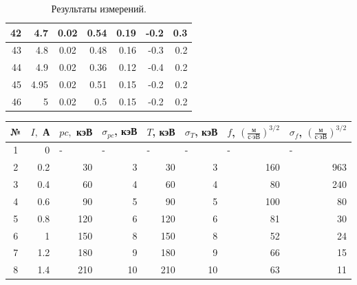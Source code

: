 \documentclass{article}
\begin{document}
\begin{table}[h!]
\begin{tabular}{|c|r|c|r|r|r|r|}
\multicolumn{1}{|r|}{42} & 4.7  & 0.02 & 0.54 & 0.19 & -0.2 & 0.3 \\ \hline
\multicolumn{1}{|r|}{43} & 4.8  & 0.02 & 0.48 & 0.16 & -0.3 & 0.2 \\ \hline
\multicolumn{1}{|r|}{44} & 4.9  & 0.02 & 0.36 & 0.12 & -0.4 & 0.2 \\ \hline
\multicolumn{1}{|r|}{45} & 4.95 & 0.02 & 0.51 & 0.15 & -0.2 & 0.2 \\ \hline
\multicolumn{1}{|r|}{46} & 5    & 0.02 & 0.5  & 0.15 & -0.2 & 0.2 \\ \hline
\end{tabular}
\caption{Результаты измерений.}
\label{BetaParticles_ExpTable}
\end{table}


  \begin{table}[h!]
\centering
\begin{tabular}{|c|r|r|r|r|r|r|r|}
\hline
№ &
  \multicolumn{1}{c|}{$ I, $ А} &
  \multicolumn{1}{c|}{$ pc,$ кэВ} &
  \multicolumn{1}{c|}{$ \sigma_{pc}$, кэВ} &
  \multicolumn{1}{c|}{$ T $, кэВ} &
  \multicolumn{1}{c|}{$ \sigma_T $, кэВ} &
  \multicolumn{1}{c|}{$ f$, $(\frac{\text{м}}{\text{с} \cdot \text{эВ}})^{3/2 }$} &
  \multicolumn{1}{c|}{$ \sigma_f$, $(\frac{\text{м}}{\text{с} \cdot \text{эВ}})^{3/2 }$}\\ \hline
1 &
  0 &
  \multicolumn{1}{l|}{-} &
  \multicolumn{1}{l|}{-} &
  \multicolumn{1}{l|}{-} &
  \multicolumn{1}{l|}{-} &
  \multicolumn{1}{l|}{-} &
  \multicolumn{1}{l|}{-} \\ \hline
2                        & 0.2  & 30  & 3  & 30  & 3  & 160                    & 963                    \\ \hline
3                        & 0.4  & 60  & 4  & 60  & 4  & 80                     & 240                    \\ \hline
4                        & 0.6  & 90  & 5  & 90  & 5  & 100                    & 80                     \\ \hline
5                        & 0.8  & 120 & 6  & 120 & 6  & 81                     & 30                     \\ \hline
6                        & 1    & 150 & 8  & 150 & 8  & 52                     & 24                     \\ \hline
7                        & 1.2  & 180 & 9  & 180 & 9  & 66                     & 15                     \\ \hline
8                        & 1.4  & 210 & 10 & 210 & 10 & 63                     & 11                     \\ \hline

\end{tabular}
\end{table}
\end{document}
